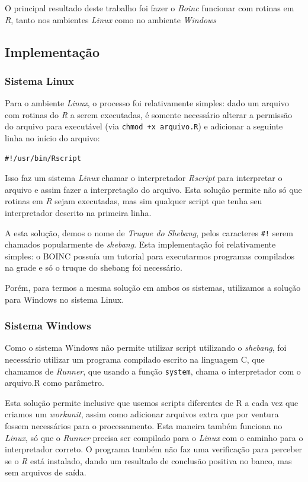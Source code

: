 O principal resultado deste trabalho foi fazer o \emph{Boinc} funcionar com rotinas em \emph{R}, tanto
nos ambientes \emph{Linux} como no ambiente \emph{Windows} %

\subsection{Implementação}

\subsubsection{Sistema Linux}

Para o ambiente \emph{Linux}, o processo foi relativamente simples: dado um arquivo com rotinas
do \emph{R} a serem executadas, é somente necessário alterar a permissão do arquivo para executável 
(via \verb#chmod +x arquivo.R#) e adicionar a seguinte linha no início do arquivo:

\begin{verbatim}
#!/usr/bin/Rscript
\end{verbatim}

Isso faz um sistema \emph{Linux} chamar o interpretador \emph{Rscript} para interpretar o arquivo  
e assim fazer a interpretação do arquivo. Esta solução permite não só que rotinas em \emph{R} sejam
executadas, mas sim qualquer script que tenha seu interpretador descrito na primeira linha.

A esta solução, demos o nome de \emph{Truque do Shebang}, pelos caracteres \verb'#!' serem chamados
popularmente de \emph{shebang}. Esta implementação foi relativamente simples: o BOINC possuía um tutorial
para executarmos programas compilados na grade e só o truque do shebang foi necessário.

Porém, para termos a mesma solução em ambos os sistemas, utilizamos a solução para 
Windows no sistema Linux. 

\subsubsection{Sistema Windows} %

Como o sistema Windows não permite utilizar script utilizando o \emph{shebang}, foi necessário 
utilizar um programa compilado escrito na linguagem C, que chamamos de \emph{Runner}, 
que usando a função \verb#system#, chama o interpretador com o arquivo.R como parâmetro. 

Esta solução permite inclusive que usemos scripts diferentes de R a cada vez que criamos um 
\emph{workunit}, assim como adicionar arquivos extra que por ventura fossem necessários para
o processamento. Esta maneira também funciona no \emph{Linux}, só que o \emph{Runner} precisa
ser compilado para o \emph{Linux} com o caminho para o interpretador correto. O programa também não faz
uma verificação para perceber se o \emph{R} está instalado, dando um resultado de conclusão positiva
no banco, mas sem arquivos de saída. 


